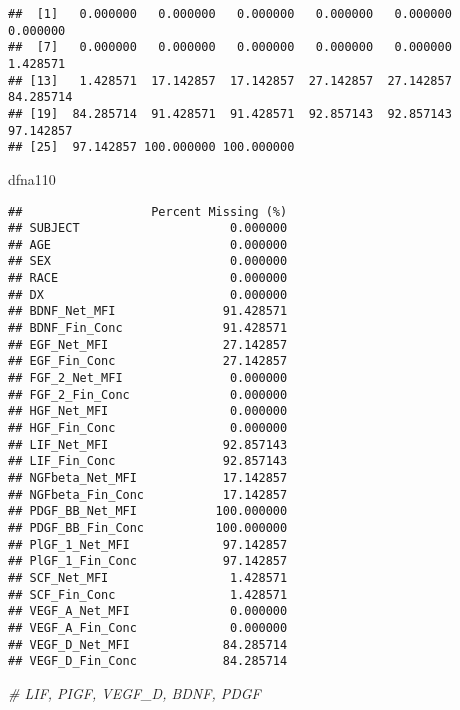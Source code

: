 \documentclass[]{article}
\newenvironment{Shaded}{\begin{snugshade}}{\end{snugshade}}
\newcommand{\CommentTok}[1]{\textcolor[rgb]{0.56,0.35,0.01}{\textit{#1}}}
\newcommand{\NormalTok}[1]{#1}
\begin{document}
\begin{verbatim}
##  [1]   0.000000   0.000000   0.000000   0.000000   0.000000   0.000000
##  [7]   0.000000   0.000000   0.000000   0.000000   0.000000   1.428571
## [13]   1.428571  17.142857  17.142857  27.142857  27.142857  84.285714
## [19]  84.285714  91.428571  91.428571  92.857143  92.857143  97.142857
## [25]  97.142857 100.000000 100.000000
\end{verbatim}

\begin{Shaded}
\begin{Highlighting}[]
\NormalTok{dfna110}
\end{Highlighting}
\end{Shaded}

\begin{verbatim}
##                  Percent Missing (%)
## SUBJECT                     0.000000
## AGE                         0.000000
## SEX                         0.000000
## RACE                        0.000000
## DX                          0.000000
## BDNF_Net_MFI               91.428571
## BDNF_Fin_Conc              91.428571
## EGF_Net_MFI                27.142857
## EGF_Fin_Conc               27.142857
## FGF_2_Net_MFI               0.000000
## FGF_2_Fin_Conc              0.000000
## HGF_Net_MFI                 0.000000
## HGF_Fin_Conc                0.000000
## LIF_Net_MFI                92.857143
## LIF_Fin_Conc               92.857143
## NGFbeta_Net_MFI            17.142857
## NGFbeta_Fin_Conc           17.142857
## PDGF_BB_Net_MFI           100.000000
## PDGF_BB_Fin_Conc          100.000000
## PlGF_1_Net_MFI             97.142857
## PlGF_1_Fin_Conc            97.142857
## SCF_Net_MFI                 1.428571
## SCF_Fin_Conc                1.428571
## VEGF_A_Net_MFI              0.000000
## VEGF_A_Fin_Conc             0.000000
## VEGF_D_Net_MFI             84.285714
## VEGF_D_Fin_Conc            84.285714
\end{verbatim}

\begin{Shaded}
\begin{Highlighting}[]
\CommentTok{# LIF, PIGF, VEGF_D, BDNF, PDGF}
\end{Highlighting}
\end{Shaded}
\end{document}
